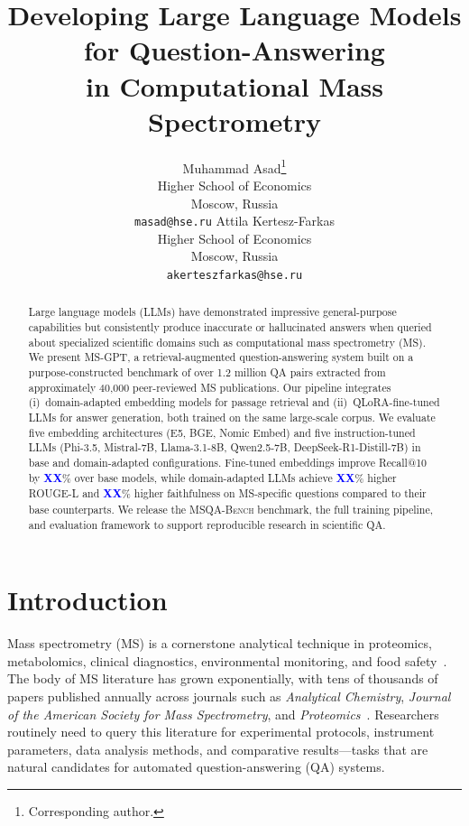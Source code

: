 \documentclass[11pt]{article}
\title{Developing Large Language Models for Question-Answering \\
in Computational Mass Spectrometry}
\author{
  Muhammad Asad\thanks{Corresponding author.} \\
  Higher School of Economics\\
  Moscow, Russia \\
  \texttt{masad@hse.ru}
  \And
  Attila Kertesz-Farkas \\
  Higher School of Economics\\
  Moscow, Russia \\
  \texttt{akerteszfarkas@hse.ru}
}
\date{}
\newcommand{\msgpt}{\textsc{MS-GPT}}
\newcommand{\msqa}{\textsc{MSQA-Bench}}
\newcommand{\placeholder}[1]{\textcolor{blue}{\textbf{#1}}}
\begin{document}
\maketitle

\begin{abstract}
Large language models (LLMs) have demonstrated impressive general-purpose
capabilities but consistently produce inaccurate or hallucinated answers when
queried about specialized scientific domains such as computational mass
spectrometry (MS). We present \msgpt{}, a retrieval-augmented
question-answering system built on a purpose-constructed benchmark of over 1.2
million QA pairs extracted from approximately 40,000 peer-reviewed MS
publications. Our pipeline integrates (i)~domain-adapted embedding models for
passage retrieval and (ii)~QLoRA-fine-tuned LLMs for answer generation, both
trained on the same large-scale corpus. We evaluate five embedding
architectures (E5, BGE, Nomic Embed) and five instruction-tuned LLMs
(Phi-3.5, Mistral-7B, Llama-3.1-8B, Qwen2.5-7B, DeepSeek-R1-Distill-7B) in
base and domain-adapted configurations. Fine-tuned embeddings improve
Recall@10 by \placeholder{XX}\% over base models, while domain-adapted LLMs
achieve \placeholder{XX}\% higher ROUGE-L and \placeholder{XX}\% higher
faithfulness on MS-specific questions compared to their base counterparts. We
release the \msqa{} benchmark, the full training pipeline, and evaluation
framework to support reproducible research in scientific QA.
\end{abstract}

\section{Introduction}
\label{sec:intro}

Mass spectrometry (MS) is a cornerstone analytical technique in proteomics,
metabolomics, clinical diagnostics, environmental monitoring, and food
safety~\citep{aebersold2003mass, fenn2003electrospray}. The body of MS
literature has grown exponentially, with tens of thousands of papers published
annually across journals such as \textit{Analytical Chemistry}, \textit{Journal
of the American Society for Mass Spectrometry}, and
\textit{Proteomics}~\citep{mann2001analysis}. Researchers routinely need to
query this literature for experimental protocols, instrument parameters, data
analysis methods, and comparative results---tasks that are natural candidates
for automated question-answering (QA) systems.
\end{document}
